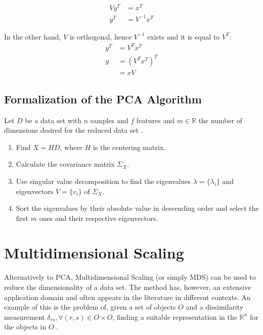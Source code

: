 \begin{align*}
	Vy^T &= x^T \\
	y^T  &= V^{-1}x^T
\end{align*}

In the other hand, $V$ is orthogonal, hence $V^{-1}$ exists and it is equal to $V^T$: \begin{align*}
	y^T &= V^Tx^T \\
	y &= (V^Tx^T)^T \\
      &= xV
\end{align*}

\subsection{Formalization of the PCA Algorithm}

Let $D$ be a data set with $n$ samples and $f$ features and $m\in\mathbb{R}$ the number of dimensions desired for the reduced data set \cite{pca2002, pcapy}.

\begin{enumerate}
	\item Find $X=HD$, where $H$ is the centering matrix.

	\item Calculate the covariance matrix $\Sigma_X$.

	\item Use singular value decomposition to find the eigenvalues $\lambda = \{\lambda_i\}$ and eigenvectors $V = \{v_i\}$ of $\Sigma_X$.

	\item Sort the eigenvalues by their absolute value in descending order and select the first $m$ ones and their respective eigenvectors.
\end{enumerate}

\section{Multidimensional Scaling}

Alternatively to PCA, Multidimensional Scaling (or simply MDS) can be used to reduce the dimensionality of a data set. The method has, however, an extensive application domain and often appears in the literature in different contexts. An example of this is the problem of, given a set of objects $O$ and a dissimilarity measurement $\delta_{rs}, \forall (r, s) \in O\times O$, finding a suitable representation in the $\mathbb{R}^n$ for the objects in $O$ \cite{cox2001}.

